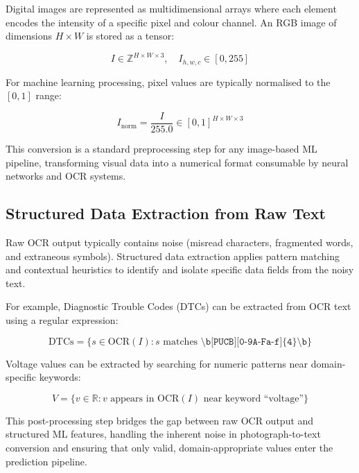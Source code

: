 \documentclass[10pt,a4paper]{article}
\begin{document}
Digital images are represented as multidimensional arrays where each element encodes the intensity of a specific pixel and colour channel. An RGB image of dimensions $H \times W$ is stored as a tensor:

\begin{equation}
I \in \mathbb{Z}^{H \times W \times 3}, \quad I_{h,w,c} \in [0, 255]
\label{eq:image-tensor}
\end{equation}

For machine learning processing, pixel values are typically normalised to the $[0, 1]$ range:

\begin{equation}
I_{\text{norm}} = \frac{I}{255.0} \in [0, 1]^{H \times W \times 3}
\label{eq:image-norm}
\end{equation}

This conversion is a standard preprocessing step for any image-based ML pipeline, transforming visual data into a numerical format consumable by neural networks and OCR systems.

\subsection{Structured Data Extraction from Raw Text}
\label{sec:structured-extraction}

Raw OCR output typically contains noise (misread characters, fragmented words, and extraneous symbols). Structured data extraction applies pattern matching and contextual heuristics to identify and isolate specific data fields from the noisy text.

For example, Diagnostic Trouble Codes (DTCs) can be extracted from OCR text using a regular expression:

\begin{equation}
\text{DTCs} = \{s \in \text{OCR}(I) : s \text{ matches } \texttt{\textbackslash b[PUCB][0-9A-Fa-f]\{4\}\textbackslash b}\}
\label{eq:dtc-extraction}
\end{equation}

Voltage values can be extracted by searching for numeric patterns near domain-specific keywords:

\begin{equation}
V = \{v \in \mathbb{R} : v \text{ appears in OCR}(I) \text{ near keyword ``voltage''}\}
\label{eq:voltage-extraction}
\end{equation}

This post-processing step bridges the gap between raw OCR output and structured ML features, handling the inherent noise in photograph-to-text conversion and ensuring that only valid, domain-appropriate values enter the prediction pipeline.
\end{document}
